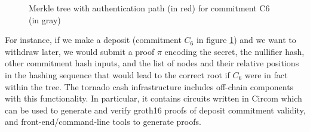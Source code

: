 \begin{figure}[ht]
\centering
{}
    \caption{Merkle tree with authentication path (in red) for commitment C6 (in gray)}
\label{fig:merkle-tree}
\end{figure}

\noindent For instance, if we make a deposit (commitment $C_6$ in figure \ref{fig:merkle-tree}) and we want to withdraw later, we would submit a proof $\pi$ encoding the secret, the nullifier hash, other commitment hash inputs, and the list of nodes and their relative positions in the hashing sequence that would lead to the correct root if $C_6$ were in fact within the tree. The tornado cash infrastructure includes off-chain components with this functionality. In particular, it contains circuits written in Circom which can be used to generate and verify groth16 proofs of deposit commitment validity, and front-end/command-line tools to generate proofs.

